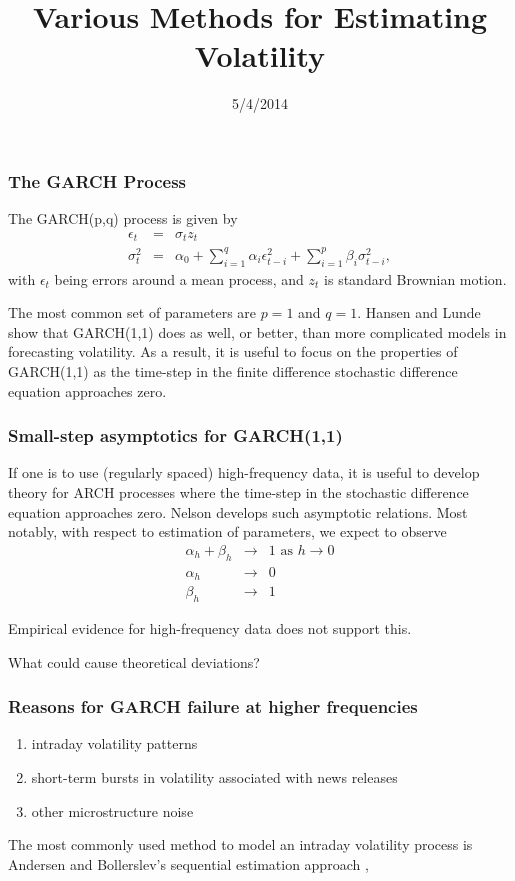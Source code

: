 \documentclass{beamer}
\title{Various Methods for Estimating Volatility}
\date{5/4/2014}
\begin{document}

\begin{frame}
  \titlepage
\end{frame}

\begin{frame}
	\frametitle{The GARCH Process}
	The GARCH(p,q) process is given by 
	\begin{eqnarray*}
		\epsilon_t &=& \sigma_t z_t \\
		\sigma_t^2 &=& \alpha_0 + \sum_{i=1}^q \alpha_i \epsilon_{t-i}^2 + \sum_{i=1}^p \beta_i \sigma^2_{t-i},
	\end{eqnarray*}
	with $\epsilon_t$ being errors around a mean process, and $z_t$ is standard Brownian motion.

	The most common set of parameters are $p=1$ and $q=1$. Hansen and Lunde \cite{hansen2005comparison} show that GARCH(1,1) does as well, or better, than more complicated models in forecasting volatility. As a result, it is useful to focus on the properties of GARCH(1,1) as the time-step in the finite difference stochastic difference equation approaches zero.
\end{frame}


\begin{frame}
	\frametitle{Small-step asymptotics for GARCH(1,1)}
	If one is to use (regularly spaced) high-frequency data, it is useful to develop theory for ARCH processes where the time-step in the stochastic difference equation approaches zero. Nelson \cite{nelson1990arch-approximations} develops such asymptotic relations. Most notably, with respect to estimation of parameters, we expect to observe
	\begin{eqnarray*}
		\alpha_h + \beta_h &\to& 1 \mbox{ as } h \to 0 \\
		\alpha_h &\to& 0 \\
		\beta_h &\to& 1 
	\end{eqnarray*}

	\pause 
	
	Empirical evidence for high-frequency data does not support this.

	\pause

	What could cause theoretical deviations?
\end{frame}

\begin{frame}
	\frametitle{Reasons for GARCH failure at higher frequencies}
	\begin{enumerate}
		\item intraday volatility patterns 
		\item short-term bursts in volatility associated with news releases
		\item other microstructure noise
	\end{enumerate}

\pause

	The most commonly used method to model an intraday volatility process is Andersen and Bollerslev's sequential estimation approach \cite{andersen1997heterogeneous}, \cite{andersen1997intraday}
\end{frame}
\end{document}
